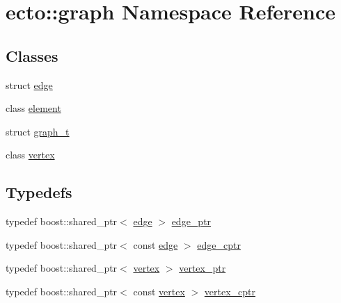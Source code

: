 \hypertarget{namespaceecto_1_1graph}{}\section{ecto\+:\+:graph Namespace Reference}
\label{namespaceecto_1_1graph}
\subsection*{Classes}
\begin{DoxyCompactItemize}
\item 
struct \hyperlink{structecto_1_1graph_1_1edge}{edge}
\item 
class \hyperlink{classecto_1_1graph_1_1element}{element}
\item 
struct \hyperlink{structecto_1_1graph_1_1graph__t}{graph\+\_\+t}
\item 
class \hyperlink{classecto_1_1graph_1_1vertex}{vertex}
\end{DoxyCompactItemize}
\subsection*{Typedefs}
\begin{DoxyCompactItemize}
\item 
typedef boost\+::shared\+\_\+ptr$<$ \hyperlink{structecto_1_1graph_1_1edge}{edge} $>$ \hyperlink{namespaceecto_1_1graph_ad6da390ef18395607e6eab139f37fcf4}{edge\+\_\+ptr}
\item 
typedef boost\+::shared\+\_\+ptr$<$ const \hyperlink{structecto_1_1graph_1_1edge}{edge} $>$ \hyperlink{namespaceecto_1_1graph_ac45fa43674f9071675a1ebbf4d021eb4}{edge\+\_\+cptr}
\item 
typedef boost\+::shared\+\_\+ptr$<$ \hyperlink{classecto_1_1graph_1_1vertex}{vertex} $>$ \hyperlink{namespaceecto_1_1graph_a878e413dd7cdb7395b02f5be20e12b51}{vertex\+\_\+ptr}
\item 
typedef boost\+::shared\+\_\+ptr$<$ const \hyperlink{classecto_1_1graph_1_1vertex}{vertex} $>$ \hyperlink{namespaceecto_1_1graph_ab1ad7248e81caff384fed98d61fca8ca}{vertex\+\_\+cptr}
\end{DoxyCompactItemize}

